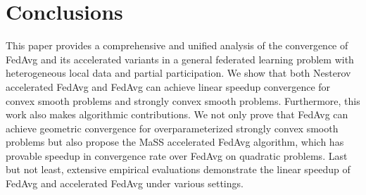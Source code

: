 
\section{Conclusions}
\begin{comment}
This paper provides a comprehensive and unified analysis of the convergence rate of FedAvg
and its accelerated variants in a general federated learning problem with heterogeneous local data and partial participation. We show that both Nesterov accelerated FedAvg and FedAvg
can achieve {\small{$\cO(\frac{1}{\sqrt{NT}})$}} linear speedup convergence for convex smooth problems and {\small{$\cO(\frac{1}{NT})$}} convergence for strongly 
convex smooth problems. In addition, we show that the local steps for stronlgy convex and convex smooth problems can be as large as {\small{$\cO(\sqrt{\frac{T}{N}})$}}, which can substantially save communication cost comparing to prior results. 
Furthermore, this work also makes algorithmic contributions. We not only prove that FedAvg can achieve exponential convergence for overparameterized strongly convex smooth problems, but also propose the MaSS accelerated Fedavg algorithm, which has provable speedup in convergence rate over FedAvg on quadratic problems. Last but not least, we empirically
verify the linear speedup of FedAvg and Nesterov accelerated FedAvg for strongly convex, convex smooth, and linear regression problems. The empirical results are well-aligned with our theories.		
\end{comment}
This paper provides a comprehensive and unified analysis of the convergence of FedAvg
and its accelerated variants in a general federated learning problem with heterogeneous local data and partial participation. 
We show that both Nesterov accelerated FedAvg and FedAvg can achieve linear speedup convergence for convex smooth problems and strongly 
convex smooth problems.  
Furthermore, this work also makes algorithmic contributions. We not only prove that FedAvg can achieve geometric convergence for overparameterized strongly convex smooth problems 
but also propose the MaSS accelerated FedAvg algorithm, which has provable speedup in convergence rate over FedAvg on quadratic problems. Last but not least, extensive empirical 
evaluations demonstrate the linear speedup of FedAvg and accelerated FedAvg under various settings.	

